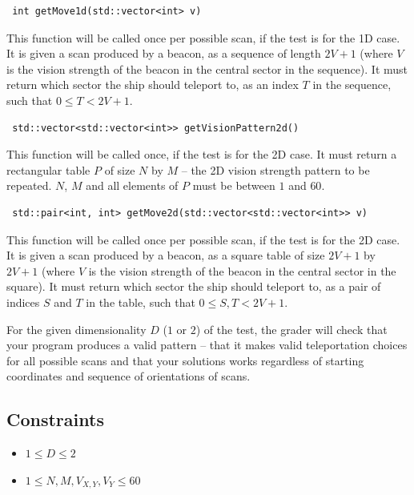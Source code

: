 \documentclass[12pt]{article}
\begin{document}
\begin{lstlisting}
 int getMove1d(std::vector<int> v)
\end{lstlisting}

This function will be called once per possible scan, if the test is for the 1D case. It is given a scan produced by a beacon, as a sequence of length $2V + 1$ (where $V$ is the vision strength of the beacon in the central sector in the sequence). It must return which sector the ship should teleport to, as an index $T$ in the sequence, such that $0 \leq T < 2V + 1$.

\begin{lstlisting}
 std::vector<std::vector<int>> getVisionPattern2d()
\end{lstlisting}

This function will be called once, if the test is for the 2D case. It must return a rectangular table $P$ of size $N$ by $M$ -- the 2D vision strength pattern to be repeated. $N$, $M$ and all elements of $P$ must be between $1$ and $60$.

\begin{lstlisting}
 std::pair<int, int> getMove2d(std::vector<std::vector<int>> v)
\end{lstlisting}

This function will be called once per possible scan, if the test is for the 2D case. It is given a scan produced by a beacon, as a square table of size $2V + 1$ by $2V + 1$ (where $V$ is the vision strength of the beacon in the central sector in the square). It must return which sector the ship should teleport to, as a pair of indices $S$ and $T$ in the table, such that $0 \leq S, T < 2V + 1$.

For the given dimensionality $D$ ($1$ or $2$) of the test, the grader will check that your program produces a valid pattern -- that it makes valid teleportation choices for all possible scans and that your solutions works regardless of starting coordinates and sequence of orientations of scans.

\subsection{Constraints}

\vspace{0.1em}

\begin{itemize}
\item $1 \leq D \leq 2$
\item $1 \leq N, M, V_{X, Y}, V_Y \leq 60$
\end{itemize}
\end{document}
